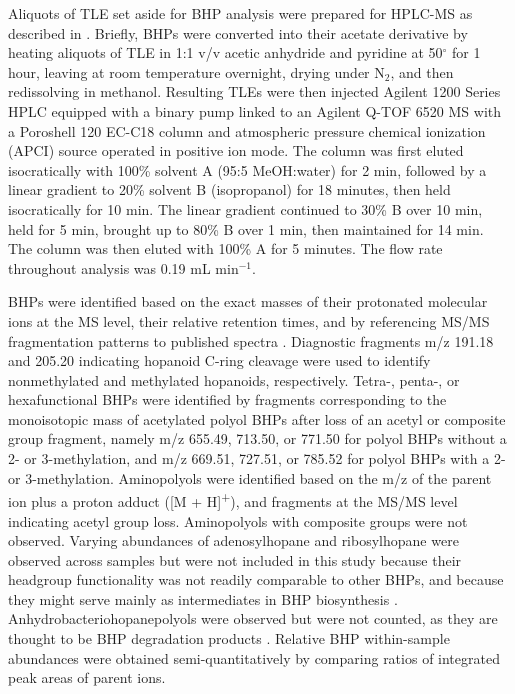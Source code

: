 Aliquots of TLE set aside for BHP analysis were prepared for HPLC-MS as described in \cite{talbot2003atmospheric}. Briefly, BHPs were converted into their acetate derivative by heating aliquots of TLE in 1:1 v/v acetic anhydride and pyridine at 50$^{\circ}$ for 1 hour, leaving at room temperature overnight, drying under N$_2$, and then redissolving in methanol. Resulting TLEs were then injected Agilent 1200 Series HPLC equipped with a binary pump linked to an Agilent Q-TOF 6520 MS with a Poroshell 120 EC-C18 column and atmospheric pressure chemical ionization (APCI) source operated in positive ion mode. The column was first eluted isocratically with 100\% solvent A (95:5 MeOH:water) for 2 min, followed by a linear gradient to 20\% solvent B (isopropanol) for 18 minutes, then held isocratically for 10 min. The linear gradient continued to 30\% B over 10 min, held for 5 min, brought up to 80\% B over 1 min, then maintained for 14 min. The column was then eluted with 100\% A for 5 minutes. The flow rate throughout analysis was 0.19 mL min$^{-1}$.

BHPs were identified based on the exact masses of their protonated molecular ions at the MS level, their relative retention times, and by referencing MS/MS fragmentation patterns to published spectra \citep{talbot2005bacteriohopanepolyols, talbot2007rapid, talbot2007structural, talbot2003atmospheric, talbot2003characteristic, talbot2008cyanobacterial}. Diagnostic fragments m/z 191.18 and 205.20 indicating hopanoid C-ring cleavage were used to identify nonmethylated and methylated hopanoids, respectively. Tetra-, penta-, or hexafunctional BHPs were identified by fragments corresponding to the monoisotopic mass of acetylated polyol BHPs after loss of an acetyl or composite group fragment, namely m/z 655.49, 713.50, or 771.50 for polyol BHPs without a 2- or 3-methylation, and m/z 669.51, 727.51, or 785.52 for polyol BHPs with a 2- or 3-methylation. Aminopolyols were identified based on the m/z of the parent ion plus a proton adduct ([M + H]\textsuperscript{+}), and fragments at the MS/MS level indicating acetyl group loss. Aminopolyols with composite groups were not observed. Varying abundances of adenosylhopane and ribosylhopane were observed across samples but were not included in this study because their headgroup functionality was not readily comparable to other BHPs, and because they might serve mainly as intermediates in BHP biosynthesis \citep{bradley2010adenosylhopane, liu2014ribosylhopane}. Anhydrobacteriohopanepolyols were observed but were not counted, as they are thought to be BHP degradation products \citep{talbot2005bacteriohopanepolyols, schaeffer2008acid}. Relative BHP within-sample abundances were obtained semi-quantitatively by comparing ratios of integrated peak areas of parent ions.



